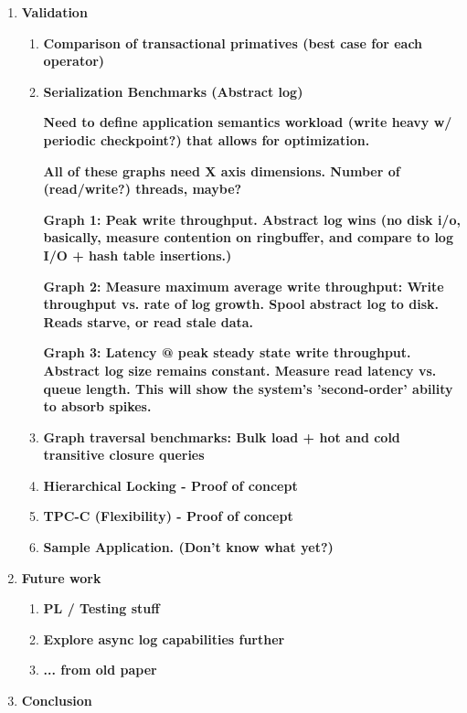\documentclass[letterpaper,english]{article}
\begin{document}
\begin{enumerate}
\begin{enumerate}

\end{enumerate}

\item {\bf Validation }

\begin{enumerate}

  \item {\bf Comparison of transactional primatives (best case for each operator)}

  \item {\bf Serialization Benchmarks (Abstract log) }

    {\bf Need to define application semantics workload (write heavy w/ periodic checkpoint?) that allows for optimization.}
    
    {\bf All of these graphs need X axis dimensions.  Number of (read/write?) threads, maybe?}
 
    {\bf Graph 1:  Peak write throughput. Abstract log wins (no disk i/o, basically, measure contention on ringbuffer, and compare to log I/O + hash table insertions.)}

    {\bf Graph 2:  Measure maximum average write throughput: Write throughput vs. rate of log growth.  Spool abstract log to disk.
              Reads starve, or read stale data. }

    {\bf Graph 3:  Latency @ peak steady state write throughput.  Abstract log size remains constant.  Measure read latency vs.
               queue length.  This will show the system's 'second-order' ability to absorb spikes. }

  \item {\bf Graph traversal benchmarks:  Bulk load + hot and cold transitive closure queries}

  \item {\bf Hierarchical Locking - Proof of concept}

  \item {\bf TPC-C (Flexibility) - Proof of concept}
    

  \item {\bf Sample Application. (Don't know what yet?) }

\end{enumerate}

\item {\bf Future work}
\begin{enumerate}
  \item {\bf PL / Testing stuff}
  \item {\bf Explore async log capabilities further}
  \item {\bf ... from old paper}
\end{enumerate}
\item {\bf Conclusion}

\end{enumerate}
\end{document}
